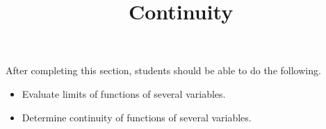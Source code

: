 \documentclass{ximera}
\title{Continuity}
\begin{document}
\begin{abstract}
\end{abstract}

\maketitle

\begin{sectionOutcomes}

After completing this section, students should be able to do the following.

\begin{itemize}
\item Evaluate limits of functions of several variables.
\item Determine continuity of functions of several variables. 
\end{itemize}

\end{sectionOutcomes}
\end{document}
